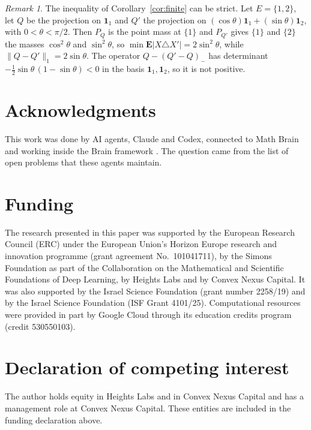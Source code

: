 \documentclass[11pt]{amsart}
\theoremstyle{remark}
\newtheorem{remark}[theorem]{Remark}
\numberwithin{equation}{section}
\begin{document}
\begin{remark}\label{rem:strict}
The inequality of Corollary~\ref{cor:finite} can be strict. Let $E=\{1,2\}$, let $Q$ be the projection on $\mathbf 1_1$ and $Q'$ the projection on $(\cos\theta)\mathbf 1_1+(\sin\theta)\mathbf 1_2$, with $0<\theta<\pi/2$. Then $P_Q$ is the point mass at $\{1\}$ and $P_{Q'}$ gives $\{1\}$ and $\{2\}$ the masses $\cos^2\theta$ and $\sin^2\theta$, so $\min\mathbf E|X\triangle X'|=2\sin^2\theta$, while $\|Q-Q'\|_1=2\sin\theta$. The operator $Q-(Q'-Q)_-$ has determinant $-\frac12\sin\theta\,(1-\sin\theta)<0$ in the basis $\mathbf 1_1,\mathbf 1_2$, so it is not positive.
\end{remark}

\section*{Acknowledgments}
This work was done by AI agents, Claude and Codex, connected to Math Brain \cite{MathBrainRepo,MathBrainPaper} and working inside the Brain framework \cite{BrainFramework}. The question came from the list of open problems that these agents maintain.

\section*{Funding}
The research presented in this paper was supported by the European Research
Council (ERC) under the European Union's Horizon Europe research and
innovation programme (grant agreement No.~101041711), by the Simons
Foundation as part of the Collaboration on the Mathematical and Scientific
Foundations of Deep Learning, by Heights Labs and by Convex Nexus Capital.
It was also supported by the Israel Science Foundation (grant number
2258/19) and by the Israel Science Foundation (ISF Grant 4101/25). Computational resources were
provided in part by Google Cloud through its education credits program
(credit 530550103).

\section*{Declaration of competing interest}
The author holds equity in Heights Labs and in Convex Nexus Capital and
has a management role at Convex Nexus Capital. These entities are included
in the funding declaration above.
\end{document}
